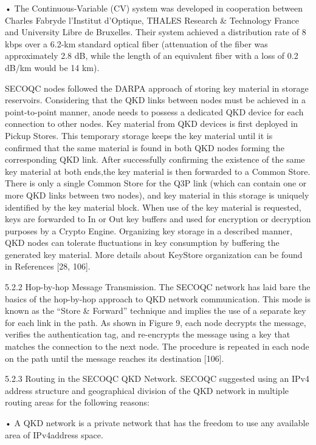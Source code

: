• The Continuous-Variable (CV) system was developed in cooperation between Charles Fabryde l’Institut d’Optique, THALES Research \& Technology France and University Libre de Bruxelles. Their system achieved a distribution rate of 8 kbps over a 6.2-km standard optical fiber (attenuation of the fiber was approximately 2.8 dB, while the length of an equivalent fiber with a loss of 0.2 dB/km would be 14 km).

SECOQC nodes followed the DARPA approach of storing key material in storage reservoirs.
Considering that the QKD links between nodes must be achieved in a point-to-point manner, anode needs to possess a dedicated QKD device for each connection to other nodes. Key material from QKD devices is first deployed in Pickup Stores. This temporary storage keeps the key material until it is confirmed that the same material is found in both QKD nodes forming the corresponding QKD link. After successfully confirming the existence of the same key material at both ends,the key material is then forwarded to a Common Store. There is only a single Common Store for the Q3P link (which can contain one or more QKD links between two nodes), and key material in this storage is uniquely identified by the key material block. When use of the key material is requested, keys are forwarded to In or Out key buffers and used for encryption or decryption purposes by a Crypto Engine. Organizing key storage in a described manner, QKD nodes can tolerate fluctuations in key consumption by buffering the generated key material. More details about KeyStore organization can be found in References [28, 106].

5.2.2 Hop-by-hop Message Transmission. The SECOQC network has laid bare the basics of the hop-by-hop approach to QKD network communication. This mode is known as the “Store \& Forward” technique and implies the use of a separate key for each link in the path. As shown in Figure 9, each node decrypts the message, verifies the authentication tag, and re-encrypts the message using a key that matches the connection to the next node. The procedure is repeated in each node on the path until the message reaches its destination [106].


5.2.3 Routing in the SECOQC QKD Network. SECOQC suggested using an IPv4 address structure and geographical division of the QKD network in multiple routing areas for the following reasons:

• A QKD network is a private network that has the freedom to use any available area of IPv4address space.

